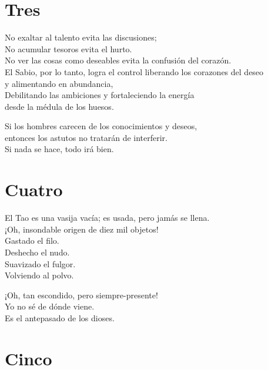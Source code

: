 \documentclass[hidelinks]{memoir}
\begin{document}
	\chapter*{Tres}
	
	No exaltar al talento evita las discusiones;\\
	No acumular tesoros evita el hurto.\\
	No ver las cosas como deseables evita la confusión del corazón.\\
	El Sabio, por lo tanto, logra el control liberando los corazones del
	deseo\\
	y alimentando en abundancia,\\
	Debilitando las ambiciones y fortaleciendo la energía\\
	desde la médula de los huesos.
	
	Si los hombres carecen de los conocimientos y deseos,\\
	entonces los astutos no tratarán de interferir.\\
	Si nada se hace, todo irá bien.
	
	\chapter*{Cuatro}
	
	El Tao es una vasija vacía; es usada, pero jamás se llena.\\
	¡Oh, insondable origen de diez mil objetos!\\
	Gastado el filo.\\
	Deshecho el nudo.\\
	Suavizado el fulgor.\\
	Volviendo al polvo.
	
	¡Oh, tan escondido, pero siempre-presente!\\
	Yo no sé de dónde viene.\\
	Es el antepasado de los dioses.
	
	\chapter*{Cinco}
	
\end{document}
